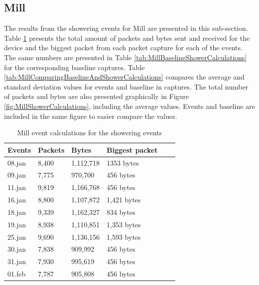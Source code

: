 \newpage
\subsection{Mill}
The results from the showering events for Mill are presented in this sub-section. Table \ref{tab:MillShowerCalculations} presents the total amount of packets and bytes sent and received for the device and the biggest packet from each packet capture for each of the events. The same numbers are presented in Table \ref{tab:MillBaselineShowerCalculations} for the corresponding baseline captures. Table \ref{tab:MillComparingBaselineAndShowerCalculations} compares the average and standard deviation values for events and baseline in captures. The total number of packets and bytes are also presented graphically in Figure \ref{fig:MillShowerCalculations}, including the average values. Events and baseline are included in the same figure to easier compare the values. 

\begin{table}[H]
    \centering
    \caption{Mill event calculations for the showering events}
    \begin{tabular}{|l|l|l|l|l|l|}
    \hline
        \textbf{Events} & \textbf{Packets} & \textbf{Bytes} & \textbf{Biggest packet} \\ \hline
        08.jan & 8,400 & 1,112,718 & 1353 bytes   \\ \hline
        09.jan & 7,775 & 970,700   & 456 bytes   \\ \hline
        11.jan & 9,819 & 1,166,768 & 456 bytes   \\ \hline
        16.jan & 8,800 & 1,107,872 & 1,421 bytes \\ \hline
        18.jan & 9,339 & 1,162,327 & 834 bytes   \\ \hline
        19.jan & 8,938 & 1,110,851 & 1,353 bytes \\ \hline
        25.jan & 9,690 & 1,136,156 & 1,593 bytes \\ \hline
        30.jan & 7,838 & 909,992   & 456 bytes  \\ \hline
        31.jan & 7,930 & 995,619   & 456 bytes \\ \hline
        01.feb & 7,787 & 905,808   & 456 bytes \\ \hline
    \end{tabular}
    \label{tab:MillShowerCalculations}
\end{table}

